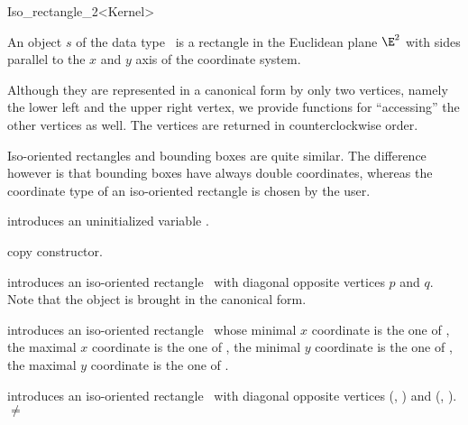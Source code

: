 \begin{ccRefClass} {Iso_rectangle_2<Kernel>}

\ccDefinition  An object $s$ of the data type \ccRefName\ is a
rectangle in the Euclidean plane $\E^2$ with sides parallel to the $x$ and
$y$ axis of the coordinate system.
 
Although they are represented in a canonical form by only two
vertices, namely the lower left and the upper right vertex, we provide
functions for ``accessing'' the other vertices as well. The vertices
are returned in counterclockwise order.

Iso-oriented rectangles and bounding boxes are quite similar. The
difference however is that bounding boxes have always double coordinates, 
whereas the coordinate type of an iso-oriented rectangle is chosen by
the user.

\ccCreation
{}


\ccHidden {}
             {introduces an uninitialized variable \ccVar.}

\ccHidden {}
            {copy constructor.}

            {introduces an iso-oriented rectangle \ccVar\ with diagonal
             opposite vertices $p$ and $q$. Note that the object is 
             brought in the canonical form.}

            {introduces an iso-oriented rectangle \ccVar\ whose
             minimal $x$ coordinate is the one of , the
             maximal $x$ coordinate is the one of , the
             minimal $y$ coordinate is the one of , the
             maximal $y$ coordinate is the one of .}

            {introduces an iso-oriented rectangle \ccVar\ with diagonal
             opposite vertices (, ) and 
             (, ).  
             \ccPrecond {} $\neq$  }


\end{ccRefClass}
